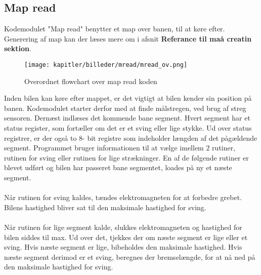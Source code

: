 \newpage

\subsection{Map read}

Kodemodulet "Map read"  benytter et map over banen, til at køre efter. Generering af map kan der læses mere om i afsnit \textbf{Referance til maå creatin sektion}.\\

\begin{figure}[ht]
\centering
\texttt{[image: kapitler/billeder/mread/mread\_ov.png]}
\caption{Overordnet flowchart over map read koden}
\label{fig:mread}
\end{figure}

Inden bilen kan køre efter mappet, er det vigtigt at bilen kender sin position på banen. Kodemodulet starter derfor med at finde målstregen, ved brug af streg sensoren. Dernæst indlæses det kommende bane segment. Hvert segment har et status register, som fortæller om det er et sving eller lige stykke. Ud over status registrer, er der også to 8- bit registre som indeholder længden af det pågældende segment. Programmet bruger informationen til at vælge imellem 2 rutiner, rutinen for sving eller rutinen for lige strækninger. En af de følgende rutiner er blevet udført og bilen har passeret bane segmentet, loades på ny et næste segment.\\
\\
Når rutinen for sving kaldes, tændes elektromagneten for at forbedre grebet. Bilens hastighed bliver sat til den maksimale hastighed for sving.\\
\\
Når rutinen for lige segment kalde, slukkes elektromagneten og hastighed for bilen siddes til max. Ud over det, tjekkes der om næste segment er lige eller et sving. Hvis næste segment er lige, bibeholdes den maksimale hastighed. Hvis næste segment derimod er et sving, beregnes der bremselængde, for at nå ned på den maksimale hastighed for sving.\\

